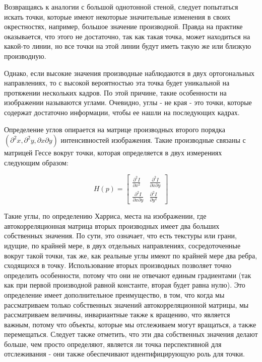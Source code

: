 Возвращаясь к аналогии с большой однотонной стеной, следует  попытаться искать точки, которые имеют некоторые значительные изменения в своих окрестностях, например, большое значение производной. Правда на практике оказывается, что этого не достаточно, так как  такая точка, может находиться на какой-то линии, но все точки на этой линии будут иметь такую же или близкую производную.

Однако, если высокие значения производные наблюдаются в двух ортогональных направлениях, то с высокой вероятностью эта точка будет уникальной на протяжении нескольких кадров. По этой причине, такие особенности на изображении называются углами. Очевидно, углы - не края - это точки, которые содержат достаточно информации, чтобы ее нашли на последующих кадрах.

Определение углов опирается на матрице производных второго порядка 
$(\partial^2 x, \partial^2 y, \partial x \partial y)$ интенсивностей изображения. Такие производные связаны с матрицей Гессе вокруг точки, которая определяется в двух измерениях следующим образом:

$$ 
H(p) = 
\begin{bmatrix} 
	\frac{\partial^2 I}{\partial x^2} & \frac{\partial^2 I}{\partial x \partial y}  \\ 
 	 \frac{\partial^2 I}{\partial x \partial y} & \frac{\partial^2 I}{\partial y^2} 
\end{bmatrix}
$$

Такие углы, по определению Харриса, места на изображении, где автокорреляционная матрица вторых производных имеет два больших собственных значения. По сути, это означает, что есть текстуры или грани, идущие, по крайней мере, в двух отдельных направлениях, сосредоточенные вокруг такой точки, так же, как реальные углы имеют по крайней мере два ребра, сходящихся в точку. Использование вторых производных позволяет точно определить особенности, потому что они не отвечают единым градиентами (так как при первой производной равной константе, вторая будет равна нулю). Это определение имеет дополнительное преимущество, в том, что когда мы рассматриваем только собственных значений автокорреляционной матрицы, мы рассматриваем величины, инвариантные также к вращению, что является важным, потому что объекты, которые мы отслеживаем могут вращаться, а также перемещаться. Следует также отметить, что эти два собственных значения делают больше, чем просто определяют, является ли точка перспективной для отслеживания - они также обеспечивают идентифицирующую роль для точки.

